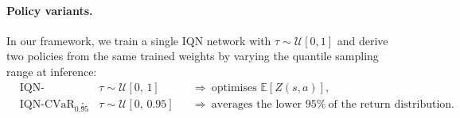 \documentclass[11pt]{article}
\newtheorem{remark}[theorem]{Remark}
\begin{document}

\paragraph{Policy variants.}
In our framework, we train a single IQN network with 
$\tau \sim \mathcal{U}[0,1]$ and derive two policies from 
the same trained weights by varying the quantile sampling 
range at inference:
\begin{equation}\label{eq:policy_variants}
\begin{aligned}
    &\text{IQN-neutral:}    
    &&\tau \sim \mathcal{U}[0,\, 1]    
    &&\Longrightarrow\ \text{optimises } 
    \mathbb{E}[Z(s,a)],\\[4pt]
    &\text{IQN-CVaR}_{0.95}\text{:} 
    &&\tau \sim \mathcal{U}[0,\, 0.95] 
    &&\Longrightarrow\ \text{averages the lower } 
    95\%\ \text{of the return distribution}.
\end{aligned}
\end{equation}


\end{document}
